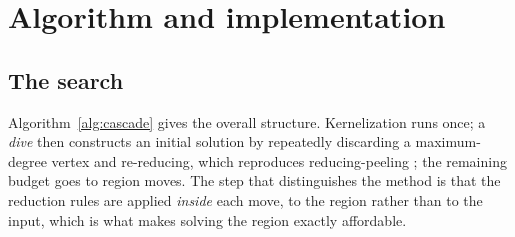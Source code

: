 \documentclass[pdflatex,sn-mathphys-num]{sn-jnl}
\theoremstyle{thmstyleone}%
\theoremstyle{thmstyletwo}%
\begin{document}
\section{Algorithm and implementation}
\label{sec:algorithm}

\subsection{The search}\label{sec:search}

Algorithm~\ref{alg:cascade} gives the overall structure. Kernelization runs
once; a \emph{dive} then constructs an initial solution by repeatedly discarding
a maximum-degree vertex and re-reducing, which reproduces reducing-peeling
\citep{chang2017}; the remaining budget goes to region moves. The step that
distinguishes the method is that the reduction rules are applied \emph{inside}
each move, to the region rather than to the input, which is what makes solving the
region exactly affordable.
\end{document}
